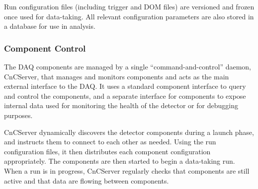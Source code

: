 Run configuration files (including trigger and DOM files) are versioned and
frozen once used for data-taking.  All relevant configuration parameters
are also stored in a database for use in analysis.

\subsubsection{Component Control}

The DAQ components are managed by a single ``command-and-control'' daemon,
CnCServer, that manages and monitors components and acts as the main
external interface to the DAQ.  It uses a standard component interface to query and
control the components, and a separate interface for components to expose
internal data used for monitoring the health of the detector or for
debugging purposes.

CnCServer dynamically discovers the detector components during a launch
phase, and instructs them to connect to each other as needed.  Using the
run configuration files, it then distributes each component configuration
appropriately.  The components are then started to begin a data-taking run.
When a run is in progress, CnCServer regularly checks that components are
still active and that data are flowing between components.




